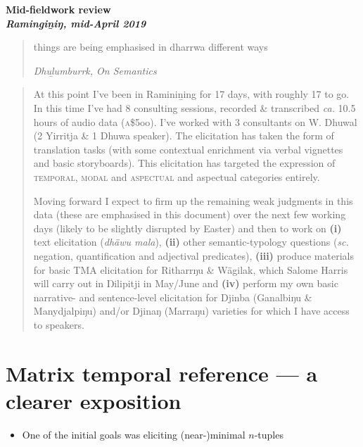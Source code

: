 \documentclass[11pt]{article}
\date{}
\begin{document}
\begin{center}
\textbf{\large Mid-fieldwork review \\\small\it Ramingiṉiŋ, mid-April 2019}

\begin{quotation}
\large things are being emphasised in dharrwa different ways

\footnotesize \textit{Dhuḻumburrk, On Semantics }

\end{quotation}

\end{center}
\begin{abstract}\small
At this point I've been in Raminiṉing for 17 days, with roughly 17 to go. In this time I've had 8 consulting sessions, recorded \& transcribed \textit{ca.} 10.5 hours of audio data (\textsc{a}\$5oo). I've worked with 3 consultants on W. Dhuwal (2 Yirritja \& 1 Dhuwa speaker). The elicitation has taken the form of translation tasks (with some contextual enrichment via verbal vignettes and basic storyboards). This elicitation has targeted the expression of \textsc{temporal, modal} and \textsc{aspectual} and aspectual categories entirely.

Moving forward I expect to firm up the remaining weak judgments in this data (these are emphasised in this document) over the next few working days (likely to be slightly disrupted by Easter) and then to work on \textbf{(i)} text elicitation (\textit{dhäwu mala}), \textbf{(ii)} other semantic-typology questions (\textit{sc.} negation, quantification and adjectival predicates), \textbf{(iii)} produce materials for basic TMA elicitation for Ritharrŋu \& Wägilak, which Salome Harris will carry out in Ŋilipitji in May/June and \textbf{(iv)} perform my own basic narrative- and sentence-level elicitation for Djinba (Ganalbiŋu \& Manydjalpiŋu) and/or Djinaŋ (Marraŋu) varieties for which I have access to speakers.
\end{abstract}

\section{Matrix temporal reference --- a clearer exposition}
\begin{itemize}
	\item One of the initial goals was eliciting (near-)minimal $ n $-tuples
\end{itemize}
\end{document}
